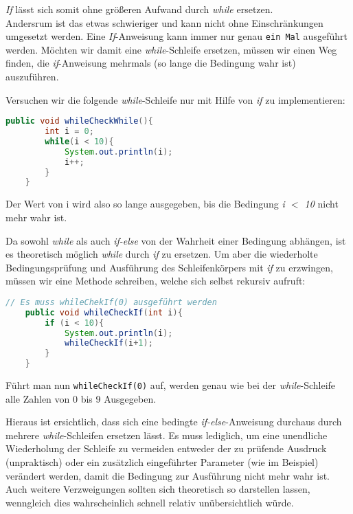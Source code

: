 \documentclass{pi1}
\begin{document}
\emph{If} lässt sich somit ohne größeren Aufwand durch \emph{while} ersetzen.\\
Andersrum ist das etwas schwieriger und kann nicht ohne Einschränkungen umgesetzt werden. Eine \emph{If}-Anweisung kann immer nur genau \texttt{ein Mal} ausgeführt werden. Möchten wir damit eine \emph{while}-Schleife ersetzen, müssen wir einen Weg finden, die \emph{if}-Anweisung mehrmals (so lange die Bedingung wahr ist) auszuführen.

Versuchen wir die folgende \emph{while}-Schleife nur mit Hilfe von \emph{if} zu implementieren:

\begin{lstlisting}[caption={}, firstnumber=1, language=Java]
 public void whileCheckWhile(){
        int i = 0;
        while(i < 10){
            System.out.println(i);
            i++;
        }
    }
\end{lstlisting}

Der Wert von i wird also so lange ausgegeben, bis die Bedingung \emph{i $<$ 10} nicht mehr wahr ist.

Da sowohl \emph{while} als auch \emph{if-else} von der Wahrheit einer Bedingung abhängen, ist es theoretisch möglich \emph{while} durch \emph{if} zu ersetzen. Um aber die wiederholte Bedingungsprüfung und Ausführung des Schleifenkörpers mit \emph{if} zu erzwingen, müssen wir eine Methode schreiben, welche sich selbst rekursiv aufruft:

\begin{lstlisting}[caption={}, firstnumber=1, language=Java]
// Es muss whileChekIf(0) ausgeführt werden
    public void whileCheckIf(int i){
        if (i < 10){
            System.out.println(i);
            whileCheckIf(i+1);
        }
    }
\end{lstlisting}

Führt man nun  \texttt{whileCheckIf(0)} auf, werden genau wie bei der \emph{while}-Schleife alle Zahlen von 0 bis 9 Ausgegeben.

Hieraus ist ersichtlich, dass sich eine bedingte \emph{if-else}-Anweisung durchaus durch mehrere \emph{while}-Schleifen ersetzen lässt. Es muss lediglich, um eine unendliche Wiederholung der Schleife zu vermeiden entweder der zu prüfende Ausdruck (unpraktisch) oder ein zusätzlich eingeführter Parameter (wie im Beispiel) verändert werden, damit die Bedingung zur Ausführung nicht mehr wahr ist. Auch weitere Verzweigungen sollten sich theoretisch so darstellen lassen, wenngleich dies wahrscheinlich schnell relativ unübersichtlich würde.
\end{document}

